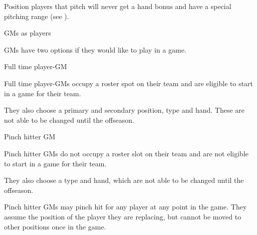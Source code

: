 \begin{deepEnumerate}
\begin{deepEnumerate}
\begin{deepEnumerate}
			\item Position players that pitch will never get a hand bonus
			and have a special pitching range (see ).
		\end{deepEnumerate}
		\item GMs as players
		\label{sec:GMs as Players}
		\begin{deepEnumerate}
			\item GMs have two options if they would like to play in a game.
			\begin{deepEnumerate}
				\item Full time player-GM
				\begin{deepEnumerate}
					\item Full time player-GMs occupy a roster spot on their team
					and are eligible to start in a game for their team.
					\item They also choose a primary and secondary position, type and hand.
					These are not able to be changed until the offseason.
				\end{deepEnumerate}
				\item Pinch hitter GM
				\begin{deepEnumerate}
					\item Pinch hitter GMs do not occupy a roster slot on their team
					and are not eligible to start in a game for their team.
					\item They also choose a type and hand,
					which are not able to be changed until the offseason.
					\item Pinch hitter GMs may pinch hit for any player at any point in the game.
					They assume the position of the player they are replacing,
					but cannot be moved to other positions once in the game.
				\end{deepEnumerate}
			\end{deepEnumerate}
		\end{deepEnumerate}
	\end{deepEnumerate}
\end{deepEnumerate}

